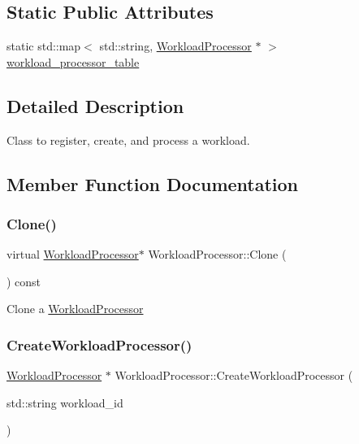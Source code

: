 \subsection*{Static Public Attributes}
\begin{DoxyCompactItemize}
\item 
static std\+::map$<$ std\+::string, \hyperlink{classWorkloadProcessor}{Workload\+Processor} $\ast$ $>$ \hyperlink{classWorkloadProcessor_a7d27005403d3bead28be816490ddf6a2}{workload\+\_\+processor\+\_\+table}
\end{DoxyCompactItemize}


\subsection{Detailed Description}
Class to register, create, and process a workload. 

\subsection{Member Function Documentation}
\mbox{\label{classWorkloadProcessor_a2fd0e60c485994a16aa52c938be576e2}} 
\subsubsection{\texorpdfstring{Clone()}{Clone()}}
{\footnotesize\ttfamily virtual \hyperlink{classWorkloadProcessor}{Workload\+Processor}$\ast$ Workload\+Processor\+::\+Clone (\begin{DoxyParamCaption}{ }\end{DoxyParamCaption}) const\hspace{0.3cm}{\ttfamily [pure virtual]}}

Clone a \hyperlink{classWorkloadProcessor}{Workload\+Processor} \mbox{\label{classWorkloadProcessor_aa0d3463d5ecf81ad6a7da65a417b1eaa}} 
\subsubsection{\texorpdfstring{Create\+Workload\+Processor()}{CreateWorkloadProcessor()}}
{\footnotesize\ttfamily \hyperlink{classWorkloadProcessor}{Workload\+Processor} $\ast$ Workload\+Processor\+::\+Create\+Workload\+Processor (\begin{DoxyParamCaption}\item[{std\+::string}]{workload\+\_\+id }\end{DoxyParamCaption})\hspace{0.3cm}{\ttfamily [static]}}

